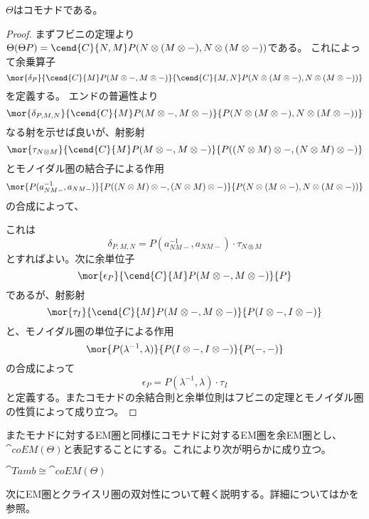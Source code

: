 \documentclass[uplatex,dvipdfmx]{jsarticle}
\begin{document}
  \begin{prop}
    $\Theta$はコモナドである。
  \end{prop}
  \begin{proof}
  まずフビニの定理より$\Theta(\Theta P) = \cend{C}{N,M}P(N\otimes (M\otimes -), N\otimes (M\otimes -))$である。
  これによって余乗算子\[\mor{\delta_P}{\cend{C}{M}P(M\otimes -,M\otimes -)}{\cend{C}{M,N}P(N\otimes (M\otimes -),N\otimes (M\otimes -))}\]を定義する。
  エンドの普遍性より\[\mor{\delta_{P,M,N}}{\cend{C}{M}P(M\otimes -,M\otimes -)}{P(N\otimes (M\otimes -),N\otimes (M\otimes -))}\]なる射を示せば良いが、射影射\[\mor{\tau_{N\otimes M}}{\cend{C}{M}P(M\otimes -,M\otimes -)}{P((N\otimes M)\otimes -,(N\otimes M)\otimes -)}\]とモノイダル圏の結合子による作用\[\mor{P(a^{-1}_{NM-},a_{NM-})}{P((N\otimes M)\otimes -,(N\otimes M)\otimes -)}{P(N\otimes (M\otimes -),N\otimes (M\otimes -))}\]の合成によって、
  
  これは\[\delta_{P,M,N} = P(a^{-1}_{NM-},a_{NM-})\cdot\tau_{N\otimes M}\]とすればよい。次に余単位子\[\mor{\epsilon_P}{\cend{C}{M}P(M\otimes -,M\otimes -)}{P}\]であるが、射影射\[\mor{\tau_I}{\cend{C}{M}P(M\otimes -,M\otimes -)}{P(I\otimes -, I\otimes -)}\]と、モノイダル圏の単位子による作用\[\mor{P(\lambda^{-1},\lambda)}{P(I\otimes -, I\otimes -)}{P(-,-)}\]の合成によって\[\epsilon_P = P(\lambda^{-1},\lambda)\cdot\tau_I\]と定義する。またコモナドの余結合則と余単位則はフビニの定理とモノイダル圏の性質によって成り立つ。
  \end{proof}
  またモナドに対するEM圏と同様にコモナドに対するEM圏を余EM圏とし、$\cat{coEM}(\Theta)$と表記することにする。これにより次が明らかに成り立つ。
  \begin{prop}\label{prop-tamb-is-coem}
    $\cat{Tamb}\cong \cat{coEM}(\Theta)$
  \end{prop}
  次にEM圏とクライスリ圏の双対性について軽く説明する。詳細については\cite{formal_theory_of_monads}か\cite{alg_monad}を参照。
\end{document}
